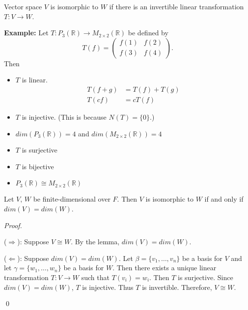 \documentclass[12pt]{article}
\newenvironment{theorem}[2][Theorem]{\begin{trivlist}
\item[\hskip \labelsep {\bfseries #1}\hskip \labelsep {\bfseries #2.}]}{\end{trivlist}}
\newenvironment{definition}[2][Definition]{\begin{trivlist}
\item[\hskip \labelsep {\bfseries #1}\hskip \labelsep {\bfseries #2}]}{\end{trivlist}}
\newenvironment{sol}
    {\emph{Proof.}
    }
    {
    \qed
    }
\begin{document}
\begin{definition}{8}
Vector space $V$ is isomorphic to $W$ if there is an invertible linear transformation $T : V \to W$.
\end{definition}

\noindent\textbf{Example:} Let $T : P_3(\mathbb{R}) \to M_{2 \times 2}(\mathbb{R})$ be defined by $$T(f) = \begin{pmatrix}
f(1) & f(2) \\ f(3) & f(4)
\end{pmatrix}.$$ Then 
\begin{itemize}
    \item[(1)] $T$ is linear.
    \begin{align*}
        T(f + g) &= T(f) + T(g) \\ T(cf) &= cT(f)
    \end{align*}
    
    \item[(2)] $T$ is injective. (This is because $N(T) = \{0\}$.)
    
    \item[(3)] $dim(P_3(\mathbb{R})) = 4$ and $dim(M_{2 \times 2}(\mathbb{R})) = 4$
    
    \item[(4)] $T$ is surjective
    
    \item[(5)] $T$ is bijective
    
    \item[(6)] $P_3(\mathbb{R}) \cong M_{2 \times 2}(\mathbb{R})$
\end{itemize}

\begin{theorem}{2.19}
Let $V$, $W$ be finite-dimensional over $F$. Then $V$ is isomorphic to $W$ if and only if $dim(V) = dim(W)$.
\end{theorem}

\begin{sol} \text{ }

($\Longrightarrow$): Suppose $V \cong W$. By the lemma, $dim(V) = dim(W)$.

($\Longleftarrow$): Suppose $dim(V) = dim(W)$. Let $\beta = \{v_1, \dots, v_n\}$ be a basis for $V$ and let $\gamma = \{w_1, \dots, w_n\}$ be a basis for $W$. Then there exists a unique linear transformation $T : V \to W$ such that $T(v_i) = w_i$. Then $T$ is surjective. Since $dim(V) = dim(W)$, $T$ is injective. Thus $T$ is invertible. Therefore, $V \cong W$.
\end{sol}
\end{document}
